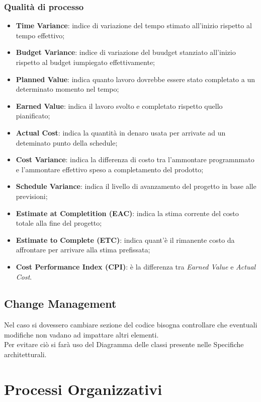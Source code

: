 \documentclass[a4paper, 12pt]{article}
\begin{document}
\subsubsection{Qualità di processo} 
\begin{itemize}
    \item \textbf{Time Variance}: indice di variazione del tempo stimato all'inizio rispetto al tempo effettivo;
    \item \textbf{Budget Variance}: indice di variazione del buudget stanziato all'inizio rispetto al budget iumpiegato effettivamente;
    \item \textbf{Planned Value}: indica quanto lavoro dovrebbe essere stato completato a un determinato momento nel tempo;
    \item \textbf{Earned Value}: indica il lavoro svolto e completato rispetto quello pianificato;
    \item \textbf{Actual Cost}: indica la quantità in denaro usata per arrivate ad un deteminato punto della schedule;
    \item \textbf{Cost Variance}: indica la differenza di costo tra l'ammontare programnmato e l'ammontare effettivo speso a completamento del prodotto;
    \item \textbf{Schedule Variance}: indica il livello di avanzamento del progetto in base alle previsioni;
    \item \textbf{Estimate at Completition (EAC)}: indica la stima corrente del costo totale alla fine del progetto;
    \item \textbf{Estimate to Complete (ETC)}: indica quant'è il rimanente costo da affrontare per arrivare alla stima prefissata;
    \item \textbf{Cost Performance Index (CPI)}: è la differenza tra \textit{Earned Value} e \textit{Actual Cost}. 

\end{itemize}





\subsection{Change Management}
Nel caso si dovessero cambiare sezione del codice bisogna controllare che eventuali modifiche
non vadano ad impattare altri elementi.\\
Per evitare ciò si farà uso del Diagramma delle classi presente nelle Specifiche architetturali.
\newpage
\section{Processi Organizzativi}
\end{document}
